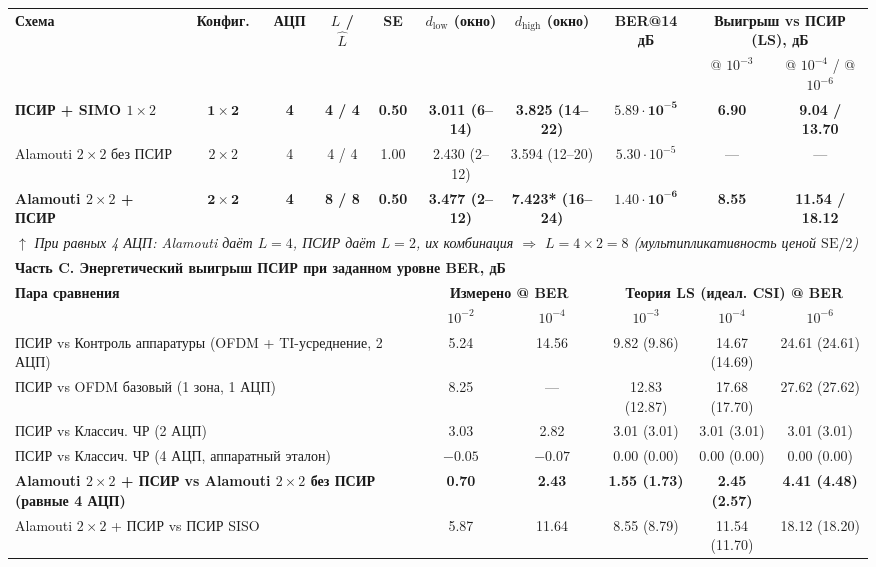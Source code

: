 \documentclass[a4paper,12pt]{article}
\numberwithin{equation}{section}
\begin{document}
\begin{table}[htbp]
\begin{adjustbox}{max width=\textwidth}
\begin{tabular}{@{}lccccccccc@{}}
\midrule
\textbf{Схема} & \textbf{Конфиг.} & \textbf{АЦП} & \textbf{$L$ / $\hat{L}$} & \textbf{SE} & \textbf{$d_{\text{low}}$ (окно)} & \textbf{$d_{\text{high}}$ (окно)} & \textbf{BER@14 дБ} & \multicolumn{2}{c}{\textbf{Выигрыш vs ПСИР (LS), дБ}} \\
\cmidrule(lr){9-10}
 & & & & & & & & @ $10^{-3}$ & @ $10^{-4}$ / @ $10^{-6}$ \\
\midrule
\textbf{ПСИР + SIMO $1{\times}2$} & $\mathbf{1{\times}2}$ & \textbf{4} & \textbf{4 / 4} & \textbf{0.50} & \textbf{3.011 (6--14)} & \textbf{3.825 (14--22)} & $\mathbf{5.89{\cdot}10^{-5}}$ & \textbf{6.90} & \textbf{9.04 / 13.70} \\
Alamouti $2{\times}2$ без ПСИР & $2{\times}2$ & 4 & 4 / 4 & 1.00 & 2.430 (2--12) & 3.594 (12--20) & $5.30{\cdot}10^{-5}$ & --- & --- \\
\textbf{Alamouti $2{\times}2$ + ПСИР} & $\mathbf{2{\times}2}$ & \textbf{4} & \textbf{8 / 8} & \textbf{0.50} & \textbf{3.477 (2--12)} & \textbf{7.423* (16--24)} & $\mathbf{1.40{\cdot}10^{-6}}$ & \textbf{8.55} & \textbf{11.54 / 18.12} \\
\midrule
\multicolumn{10}{l}{\hspace{0.5em}$\uparrow$ \textit{При равных 4 АЦП: Alamouti даёт $L{=}4$, ПСИР даёт $L{=}2$, их комбинация $\Rightarrow$ $L{=}4{\times}2{=}8$ (мультипликативность ценой $\text{SE}/2$)}} \\
\midrule
\multicolumn{10}{l}{\textbf{Часть C. Энергетический выигрыш ПСИР при заданном уровне BER, дБ}} \\
\midrule
\multicolumn{5}{l}{\textbf{Пара сравнения}} & \multicolumn{2}{c}{\textbf{Измерено @ BER}} & \multicolumn{3}{c}{\textbf{Теория LS (идеал. CSI) @ BER}} \\
\cmidrule(lr){6-7} \cmidrule(lr){8-10}
\multicolumn{5}{l}{} & $10^{-2}$ & $10^{-4}$ & $10^{-3}$ & $10^{-4}$ & $10^{-6}$ \\
\midrule
\multicolumn{5}{l}{ПСИР vs Контроль аппаратуры (OFDM + TI-усреднение, 2 АЦП)} & 5.24 & 14.56 & 9.82 (9.86) & 14.67 (14.69) & 24.61 (24.61) \\
\multicolumn{5}{l}{ПСИР vs OFDM базовый (1 зона, 1 АЦП)} & 8.25 & --- & 12.83 (12.87) & 17.68 (17.70) & 27.62 (27.62) \\
\multicolumn{5}{l}{ПСИР vs Классич. ЧР (2 АЦП)} & 3.03 & 2.82 & 3.01 (3.01) & 3.01 (3.01) & 3.01 (3.01) \\
\multicolumn{5}{l}{ПСИР vs Классич. ЧР (4 АЦП, аппаратный эталон)} & $-0.05$ & $-0.07$ & 0.00 (0.00) & 0.00 (0.00) & 0.00 (0.00) \\
\multicolumn{5}{l}{\textbf{Alamouti $2{\times}2$ + ПСИР vs Alamouti $2{\times}2$ без ПСИР (равные 4 АЦП)}} & \textbf{0.70} & \textbf{2.43} & \textbf{1.55 (1.73)} & \textbf{2.45 (2.57)} & \textbf{4.41 (4.48)} \\
\multicolumn{5}{l}{Alamouti $2{\times}2$ + ПСИР vs ПСИР SISO} & 5.87 & 11.64 & 8.55 (8.79) & 11.54 (11.70) & 18.12 (18.20) \\
\bottomrule
\end{tabular}
\end{adjustbox}
\end{table}
\end{document}
